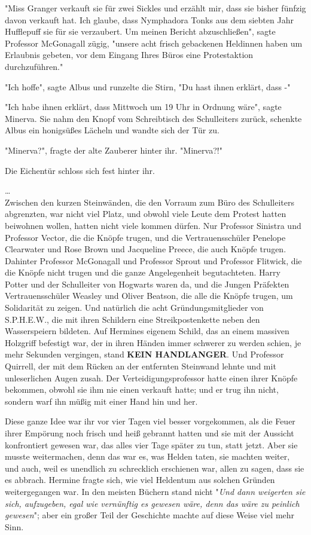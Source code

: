 {"Miss Granger verkauft sie für zwei Sickles und erzählt mir, dass sie bisher fünfzig davon verkauft hat. Ich glaube, dass Nymphadora Tonks aus dem siebten Jahr Hufflepuff sie für sie verzaubert. Um meinen Bericht abzuschließen", sagte Professor McGonagall zügig, "unsere acht frisch gebackenen Heldinnen haben um Erlaubnis gebeten, vor dem Eingang Ihres Büros eine Protestaktion durchzuführen."

"Ich hoffe", sagte Albus und runzelte die Stirn, "Du hast ihnen erklärt, dass -"

"Ich habe ihnen erklärt, dass Mittwoch um 19 Uhr in Ordnung wäre", sagte Minerva. Sie nahm den Knopf vom Schreibtisch des Schulleiters zurück, schenkte Albus ein honigsüßes Lächeln und wandte sich der Tür zu.

"Minerva?", fragte der alte Zauberer hinter ihr. "Minerva?!"

Die Eichentür schloss sich fest hinter ihr.

…\\ Zwischen den kurzen Steinwänden, die den Vorraum zum Büro des Schulleiters abgrenzten, war nicht viel Platz, und obwohl viele Leute dem Protest hatten beiwohnen wollen, hatten nicht viele kommen dürfen. Nur Professor Sinistra und Professor Vector, die die Knöpfe trugen, und die Vertrauensschüler Penelope Clearwater und Rose Brown und Jacqueline Preece, die auch Knöpfe trugen. Dahinter Professor McGonagall und Professor Sprout und Professor Flitwick, die die Knöpfe nicht trugen und die ganze Angelegenheit begutachteten. Harry Potter und der Schulleiter von Hogwarts waren da, und die Jungen Präfekten Vertrauensschüler Weasley und Oliver Beatson, die alle die Knöpfe trugen, um Solidarität zu zeigen. Und natürlich die acht Gründungsmitglieder von S.P.H.E.W., die mit ihren Schildern eine Streikpostenkette neben den Wasserspeiern bildeten. Auf Hermines eigenem Schild, das an einem massiven Holzgriff befestigt war, der in ihren Händen immer schwerer zu werden schien, je mehr Sekunden vergingen, stand \textbf{KEIN HANDLANGER}. Und Professor Quirrell, der mit dem Rücken an der entfernten Steinwand lehnte und mit unleserlichen Augen zusah. Der Verteidigungsprofessor hatte einen ihrer Knöpfe bekommen, obwohl sie ihm nie einen verkauft hatte; und er trug ihn nicht, sondern warf ihn müßig mit einer Hand hin und her.

Diese ganze Idee war ihr vor vier Tagen viel besser vorgekommen, als die Feuer ihrer Empörung noch frisch und heiß gebrannt hatten und sie mit der Aussicht konfrontiert gewesen war, das alles vier Tage später zu tun, statt jetzt. Aber sie musste weitermachen, denn das war es, was Helden taten, sie machten weiter, und auch, weil es unendlich zu schrecklich erschienen war, allen zu sagen, dass sie es abbrach. Hermine fragte sich, wie viel Heldentum aus solchen Gründen weitergegangen war. In den meisten Büchern stand nicht "\emph{Und dann weigerten sie sich, aufzugeben, egal wie vernünftig es gewesen wäre, denn das wäre zu peinlich gewesen}"; aber ein großer Teil der Geschichte machte auf diese Weise viel mehr Sinn.

}
